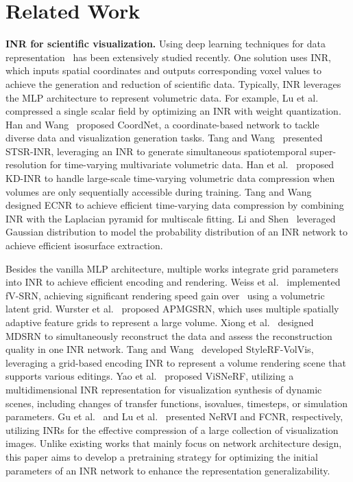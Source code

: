 \vspace{-0.075in}
\section{Related Work}
\vspace{-0.025in}

{\bf INR for scientific visualization.}
Using deep learning techniques for data representation~\cite{Wang-DL4SciVis} has been extensively studied recently. 
One solution uses INR, which inputs spatial coordinates and outputs corresponding voxel values to achieve the generation and reduction of scientific data. 
Typically, INR leverages the MLP architecture to represent volumetric data.
For example, Lu et al.\ \cite{Lu-neurcomp} compressed a single scalar field by optimizing an INR with weight quantization.
Han and Wang~\cite{Han-TVCG23} proposed CoordNet, a coordinate-based network to tackle diverse data and visualization generation tasks.
Tang and Wang~\cite{Tang-CG24} presented STSR-INR, leveraging an INR to generate simultaneous spatiotemporal super-resolution for time-varying multivariate volumetric data.
Han et al.\ \cite{Han-KD-INR} proposed KD-INR to handle large-scale time-varying volumetric data compression when volumes are only sequentially accessible during training.
Tang and Wang~\cite{Tang-PVIS24} designed ECNR to achieve efficient time-varying data compression by combining INR with the Laplacian pyramid for multiscale fitting.
Li and Shen~\cite{Li-TVCG24} leveraged Gaussian distribution to model the probability distribution of an INR network to achieve efficient isosurface extraction.

Besides the vanilla MLP architecture, multiple works integrate grid parameters into INR to achieve efficient encoding and rendering.
Weiss et al.\ \cite{Weiss-CGF22} implemented fV-SRN, achieving significant rendering speed gain over~\cite{Lu-neurcomp} using a volumetric latent grid.
Wurster et al.\ \cite{Wurster-TVCG24} proposed APMGSRN, which uses multiple spatially adaptive feature grids to represent a large volume.
Xiong et al.\ \cite{Xiong-TVCG24} designed MDSRN to simultaneously reconstruct the data and assess the reconstruction quality in one INR network.
Tang and Wang~\cite{Tang-VIS24} developed StyleRF-VolVis, leveraging a grid-based encoding INR to represent a volume rendering scene that supports various editings.
Yao et al.\ \cite{Yao-PVIS25} proposed ViSNeRF, utilizing a multidimensional INR representation for visualization synthesis of dynamic scenes, including changes of transfer functions, isovalues, timesteps, or simulation parameters. 
Gu et al.\ \cite{Gu-CG23} and Lu et al.\ \cite{YF-Lu-VISSP24} presented NeRVI and FCNR, respectively, utilizing INRs for the effective compression of a large collection of visualization images. 
%
Unlike existing works that mainly focus on network architecture design, this paper aims to develop a pretraining strategy for optimizing the initial parameters of an INR network to enhance the representation generalizability.

